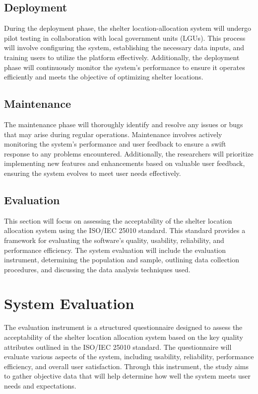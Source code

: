 \subsection{Deployment}
	During the deployment phase, the shelter location-allocation system will undergo pilot testing in collaboration with local government units (LGUs). This process will involve configuring the system, establishing the necessary data inputs, and training users to utilize the platform effectively. Additionally, the deployment phase will continuously monitor the system's performance to ensure it operates efficiently and meets the objective of optimizing shelter locations. 

\subsection{Maintenance}
	The maintenance phase will thoroughly identify and resolve any issues or bugs that may arise during regular operations. Maintenance involves actively monitoring the system's performance and user feedback to ensure a swift response to any problems encountered. Additionally, the researchers will prioritize implementing new features and enhancements based on valuable user feedback, ensuring the system evolves to meet user needs effectively.
	
\subsection{Evaluation}
	This section will focus on assessing the acceptability of the shelter location allocation system using the ISO/IEC 25010 standard. This standard provides a framework for evaluating the software's quality, usability, reliability, and performance efficiency. The system evaluation will include the evaluation instrument, determining the population and sample, outlining data collection procedures, and discussing the data analysis techniques used.

\section{System Evaluation}
	The evaluation instrument is a structured questionnaire designed to assess the acceptability of the shelter location allocation system based on the key quality attributes outlined in the ISO/IEC 25010 standard. The questionnaire will evaluate various aspects of the system, including usability, reliability, performance efficiency, and overall user satisfaction. Through this instrument, the study aims to gather objective data that will help determine how well the system meets user needs and expectations.

